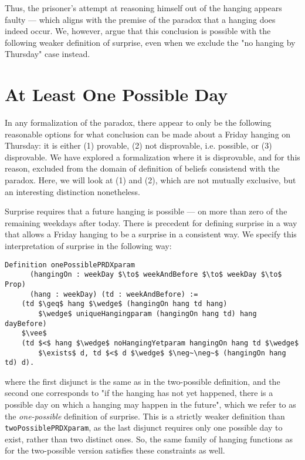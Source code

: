\documentclass[runningheads]{llncs}
\begin{document}
Thus, the prisoner's attempt at reasoning himself out
of the hanging appears faulty --- which aligns with the premise of the
paradox that a hanging does indeed occur.
We, however, argue that this conclusion
is possible with the following weaker definition of surprise, even
when we exclude the "no hanging by Thursday" case instead.

\section{At Least One Possible Day}
\label{sec:one}

In any formalization of the paradox, there appear to only be the following reasonable
options for what conclusion
can be made about a Friday hanging on Thursday: it is either (1) provable,
(2) not disprovable, i.e. possible, or (3) disprovable.
We have explored a formalization where it is disprovable, and for this reason,
excluded from the domain of definition of beliefs consistend with the paradox.
Here, we will look at
(1) and (2), which are not mutually exclusive, but an interesting distinction nonetheless.

Surprise requires that a future hanging is possible --- on more than zero
of the remaining weekdays after today. There is precedent \cite{fourpossible}
for defining surprise
in a way that allows a Friday hanging to be a surprise in a consistent way.
We specify this interpretation of surprise in the following way:

\begin{lstlisting}[mathescape=true]
  Definition onePossiblePRDXparam
      (hangingOn : weekDay $\to$ weekAndBefore $\to$ weekDay $\to$ Prop)
      (hang : weekDay) (td : weekAndBefore) :=
    (td $\geq$ hang $\wedge$ (hangingOn hang td hang)
        $\wedge$ uniqueHangingparam (hangingOn hang td) hang dayBefore)
    $\vee$
    (td $<$ hang $\wedge$ noHangingYetparam hangingOn hang td $\wedge$
        $\exists$ d, td $<$ d $\wedge$ $\neg~\neg~$ (hangingOn hang td) d).
\end{lstlisting}

where the first disjunct is the same as in the two-possible definition, and
the second one corresponds to "if the hanging has not yet happened, there is a
possible day on which a hanging may happen in the future", which
  we refer to as the \emph{one-possible} definition of surprise. This is a strictly
weaker definition than {\tt twoPossiblePRDXparam}, as the last
disjunct requires only one possible day to exist, rather than two distinct ones.
So, the same family of hanging functions as for the two-possible version satisfies these
constraints as well.
\end{document}
